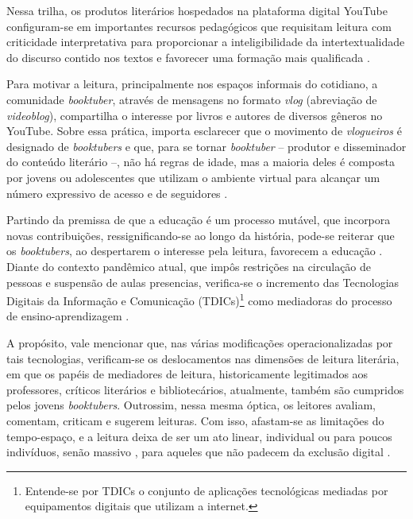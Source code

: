 \documentclass[portuguese]{textolivre}
\begin{document}
Nessa trilha, os produtos literários hospedados na plataforma digital
YouTube configuram-se em importantes recursos pedagógicos que requisitam
leitura com criticidade interpretativa para proporcionar a
inteligibilidade da intertextualidade do discurso contido nos textos e
favorecer uma formação mais qualificada \cite{Quiles2021}.%

Para motivar a leitura, principalmente nos espaços informais do
cotidiano, a comunidade \emph{booktuber}, através de mensagens no
formato \emph{vlog} (abreviação de \emph{videoblog}), compartilha o
interesse por livros e autores de diversos gêneros no YouTube. Sobre
essa prática, importa esclarecer que o movimento de \emph{vlogueiros} é
designado de \emph{booktubers} e que, para se tornar \emph{booktuber} --
produtor e disseminador do conteúdo literário --, não há regras de
idade, mas a maioria deles é composta por jovens ou adolescentes que
utilizam o ambiente virtual para alcançar um número expressivo de acesso
e de seguidores \cite{oliveira2021booktubers,Teixeira2016,Tomasena2021,VizcanoVerd2019}. %

Partindo da premissa de que a educação é um processo mutável, que
incorpora novas contribuições, ressignificando-se ao longo da história,
pode-se reiterar que os \emph{booktubers}, ao despertarem o interesse
pela leitura, favorecem a educação \cite{Souza2020}. %
Diante do
contexto pandêmico atual, que impôs restrições na circulação de pessoas
e suspensão de aulas presencias, verifica-se o incremento das
Tecnologias Digitais da Informação e Comunicação (TDICs)\footnote{
  Entende-se por TDICs o conjunto de aplicações tecnológicas mediadas
  por equipamentos digitais que utilizam a internet.} como mediadoras do
processo de ensino-aprendizagem \cite{neves_utilizacao_2021b,neves_ensino_2021d}.

A propósito, vale mencionar que, nas várias modificações
operacionalizadas por tais tecnologias, verificam-se os deslocamentos
nas dimensões de leitura literária, em que os papéis de mediadores de
leitura, historicamente legitimados aos professores, críticos literários
e bibliotecários, atualmente, também são cumpridos pelos jovens
\emph{booktubers}. Outrossim, nessa mesma óptica, os leitores avaliam,
comentam, criticam e sugerem leituras. Com isso, afastam-se as
limitações do tempo-espaço, e a leitura deixa de ser um ato linear,
individual ou para poucos indivíduos, senão massivo \cite{Kirchof2018}, %
para aqueles que não padecem da exclusão digital \cite{neves_trabalho_2021c}.
\end{document}
